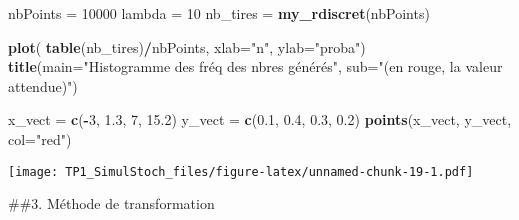 \documentclass[]{article}
\newenvironment{Shaded}{\begin{snugshade}}{\end{snugshade}}
\newcommand{\DataTypeTok}[1]{\textcolor[rgb]{0.13,0.29,0.53}{#1}}
\newcommand{\DecValTok}[1]{\textcolor[rgb]{0.00,0.00,0.81}{#1}}
\newcommand{\FloatTok}[1]{\textcolor[rgb]{0.00,0.00,0.81}{#1}}
\newcommand{\KeywordTok}[1]{\textcolor[rgb]{0.13,0.29,0.53}{\textbf{#1}}}
\newcommand{\NormalTok}[1]{#1}
\newcommand{\OperatorTok}[1]{\textcolor[rgb]{0.81,0.36,0.00}{\textbf{#1}}}
\newcommand{\StringTok}[1]{\textcolor[rgb]{0.31,0.60,0.02}{#1}}
\begin{document}
\begin{Shaded}
\begin{Highlighting}[]
\NormalTok{nbPoints =}\StringTok{ }\DecValTok{10000}
\NormalTok{lambda =}\StringTok{ }\DecValTok{10}
\NormalTok{nb_tires =}\StringTok{ }\KeywordTok{my_rdiscret}\NormalTok{(nbPoints)}

\KeywordTok{plot}\NormalTok{( }\KeywordTok{table}\NormalTok{(nb_tires)}\OperatorTok{/}\NormalTok{nbPoints, }\DataTypeTok{xlab=}\StringTok{"n"}\NormalTok{, }\DataTypeTok{ylab=}\StringTok{"proba"}\NormalTok{)}
\KeywordTok{title}\NormalTok{(}\DataTypeTok{main=}\StringTok{"Histogramme des fréq des nbres générés"}\NormalTok{,}
      \DataTypeTok{sub=}\StringTok{"(en rouge, la valeur attendue)"}\NormalTok{)}

\NormalTok{x_vect =}\StringTok{ }\KeywordTok{c}\NormalTok{(}\OperatorTok{-}\DecValTok{3}\NormalTok{, }\FloatTok{1.3}\NormalTok{, }\DecValTok{7}\NormalTok{, }\FloatTok{15.2}\NormalTok{)}
\NormalTok{y_vect =}\StringTok{ }\KeywordTok{c}\NormalTok{(}\FloatTok{0.1}\NormalTok{, }\FloatTok{0.4}\NormalTok{, }\FloatTok{0.3}\NormalTok{, }\FloatTok{0.2}\NormalTok{)}
\KeywordTok{points}\NormalTok{(x_vect, y_vect, }\DataTypeTok{col=}\StringTok{"red"}\NormalTok{)}
\end{Highlighting}
\end{Shaded}

\texttt{[image: TP1\_SimulStoch\_files/figure-latex/unnamed-chunk-19-1.pdf]}

\#\#3. Méthode de transformation
\end{document}
